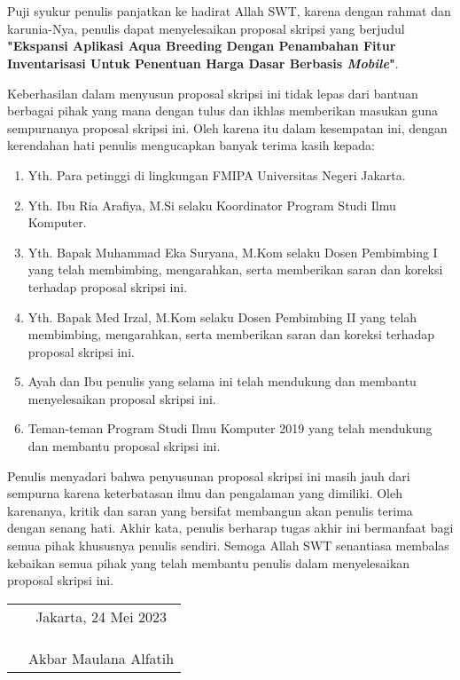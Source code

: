 \chapter*{}

Puji syukur penulis panjatkan ke hadirat Allah SWT, karena dengan rahmat dan karunia-Nya, penulis dapat menyelesaikan proposal skripsi yang berjudul \textbf{"Ekspansi Aplikasi Aqua Breeding Dengan Penambahan Fitur Inventarisasi Untuk Penentuan Harga Dasar Berbasis \textit{Mobile}"}.

Keberhasilan dalam menyusun proposal skripsi ini tidak lepas dari bantuan berbagai pihak yang mana dengan tulus dan ikhlas memberikan masukan guna sempurnanya proposal skripsi ini. Oleh karena itu dalam kesempatan ini, dengan kerendahan hati penulis mengucapkan banyak terima kasih kepada:

\begin{enumerate}

	\item{Yth. Para petinggi di lingkungan FMIPA Universitas Negeri Jakarta.}
	\item{Yth. Ibu Ria Arafiya, M.Si selaku Koordinator Program Studi Ilmu Komputer.}
	\item{Yth. Bapak Muhammad Eka Suryana, M.Kom selaku Dosen Pembimbing I yang telah membimbing, mengarahkan, serta memberikan saran dan koreksi terhadap proposal skripsi ini.}
	\item{Yth. Bapak Med Irzal, M.Kom selaku Dosen Pembimbing II yang telah membimbing, mengarahkan, serta memberikan saran dan koreksi terhadap proposal skripsi ini.}
	\item{Ayah dan Ibu penulis yang selama ini telah mendukung dan membantu menyelesaikan proposal skripsi ini.}
	\item{Teman-teman Program Studi Ilmu Komputer 2019 yang telah mendukung dan membantu proposal skripsi ini.}
	
\end{enumerate}

Penulis menyadari bahwa penyusunan proposal skripsi ini masih jauh dari sempurna karena keterbatasan ilmu dan pengalaman yang dimiliki. Oleh karenanya, kritik dan saran yang bersifat membangun akan penulis terima dengan senang hati. Akhir kata, penulis berharap tugas akhir ini bermanfaat bagi semua pihak khususnya penulis sendiri. Semoga Allah SWT senantiasa membalas kebaikan semua pihak yang telah membantu penulis dalam menyelesaikan proposal skripsi ini.

\vspace{4cm}

\begin{tabular}{p{7.5cm}c}
	&Jakarta, 24 Mei 2023\\
	&\\
	&\\
	&\\
	&Akbar Maulana Alfatih
\end{tabular}